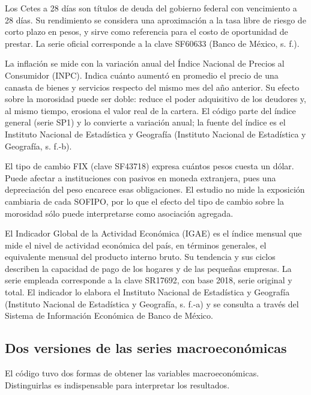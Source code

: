 Los Cetes a 28 días son títulos de deuda del gobierno federal con vencimiento a 28 días. Su rendimiento se considera una aproximación a la tasa libre de riesgo de corto plazo en pesos, y sirve como referencia para el costo de oportunidad de prestar. La serie oficial corresponde a la clave SF60633 (Banco de México, s. f.).

La inflación se mide con la variación anual del Índice Nacional de Precios al Consumidor (INPC). Indica cuánto aumentó en promedio el precio de una canasta de bienes y servicios respecto del mismo mes del año anterior. Su efecto sobre la morosidad puede ser doble: reduce el poder adquisitivo de los deudores y, al mismo tiempo, erosiona el valor real de la cartera. El código parte del índice general (serie SP1) y lo convierte a variación anual; la fuente del índice es el Instituto Nacional de Estadística y Geografía (Instituto Nacional de Estadística y Geografía, s. f.-b).

El tipo de cambio FIX (clave SF43718) expresa cuántos pesos cuesta un dólar. Puede afectar a instituciones con pasivos en moneda extranjera, pues una depreciación del peso encarece esas obligaciones. El estudio no mide la exposición cambiaria de cada SOFIPO, por lo que el efecto del tipo de cambio sobre la morosidad sólo puede interpretarse como asociación agregada.

El Indicador Global de la Actividad Económica (IGAE) es el índice mensual que mide el nivel de actividad económica del país, en términos generales, el equivalente mensual del producto interno bruto. Su tendencia y sus ciclos describen la capacidad de pago de los hogares y de las pequeñas empresas. La serie empleada corresponde a la clave SR17692, con base 2018, serie original y total. El indicador lo elabora el Instituto Nacional de Estadística y Geografía (Instituto Nacional de Estadística y Geografía, s. f.-a) y se consulta a través del Sistema de Información Económica de Banco de México.

\subsection{Dos versiones de las series macroeconómicas}
El código tuvo dos formas de obtener las variables macroeconómicas. Distinguirlas es indispensable para interpretar los resultados.

